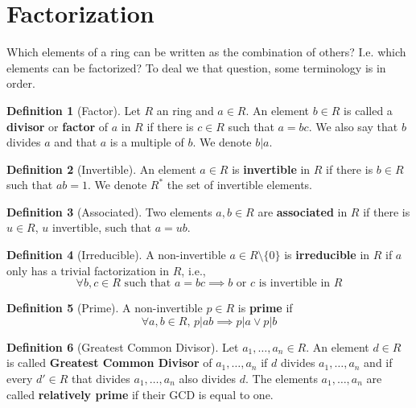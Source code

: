 \documentclass[12pt,a4paper]{article}
\theoremstyle{definition}
\newtheorem{definition}{Definition}[section]
\begin{document}
\section{Factorization}

Which elements of a ring can be written as the combination of others? I.e. which elements can be factorized? To deal we that question, some terminology is in order.

\begin{definition}[Factor]
Let $R$ an ring and $a \in R$. An element $b \in R$ is called a \textbf{divisor} or \textbf{factor} of $a$ in $R$ if there is $c \in R$ such that $a=bc$. We also say that $b$ divides $a$ and that $a$ is a multiple of $b$. We denote $b | a$.
\end{definition}

\begin{definition}[Invertible]
An element $a \in R$ is \textbf{invertible} in $R$ if there is $b \in R$ such that $ab = 1$. We denote $R^{\ast}$ the set of invertible elements.
\end{definition}

\begin{definition}[Associated]
Two elements $a,b \in R$ are \textbf{associated} in $R$ if there is $u \in R$, $u$ invertible, such that $a = ub$.
\end{definition}

\begin{definition}[Irreducible]
A non-invertible $a \in R \setminus \{ 0 \}$ is \textbf{irreducible} in $R$ if $a$ only has a trivial factorization in $R$, i.e.,
\[
\forall b, c \in R \text{ such that } a = bc \implies b \text{ or } c \text{ is invertible in } R
\]
\end{definition}

\begin{definition}[Prime]
A non-invertible $p \in R$ is \textbf{prime} if
\[
\forall a, b \in R, \, p|ab \implies p|a \lor p|b
\]
\end{definition}

\begin{definition}[Greatest Common Divisor]
Let $a_1, \ldots, a_n \in R$. An element $d \in R$ is called \textbf{Greatest Common Divisor} of $a_1, \ldots, a_n$ if $d$ divides $a_1, \ldots, a_n$ and if every $d' \in R$ that divides $a_1, \ldots, a_n$ also divides $d$. The elements $a_1, \ldots, a_n$ are called \textbf{relatively prime} if their GCD is equal to one.
\end{definition}
\end{document}
